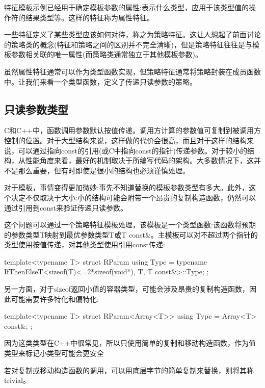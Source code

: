 
特征模板示例已经用于确定模板参数的属性:表示什么类型，应用于该类型值的操作符的结果类型等。这样的特征称为属性特征。

一些特征定义了某些类型应该如何对待，称之为策略特征。这让人想起了前面讨论的策略类的概念(特征和策略之间的区别并不完全清晰)，但是策略特征往往是与模板参数相关联的唯一属性(而策略类通常独立于其他模板参数)。

虽然属性特征通常可以作为类型函数实现，但策略特征通常将策略封装在成员函数中。让我们来看一个类型函数，定义了传递只读参数的策略。

\subsection{只读参数类型}

C和C++中，函数调用参数默认按值传递。调用方计算的参数值可复制到被调用方控制的位置。对于大型结构来说，这样做的代价会很高，而且对于这样的结构来说，可以通过指向const的引用(或C中指向const的指针)传递参数。对于较小的结构，从性能角度来看，最好的机制取决于所编写代码的架构。大多数情况下，这并不是那么重要，但有时即使是很小的结构也必须谨慎处理。

对于模板，事情变得更加微妙:事先不知道替换的模板参数类型有多大。此外，这个决定不仅取决于大小:小的结构可能会附带一个昂贵的复制构造函数，仍然可以通过引用到const来验证传递只读参数。

这个问题可以通过一个策略特征模板处理，该模板是一个类型函数:该函数将预期的参数类型T映射到最优参数类型T或T const\&。主模板可以对不超过两个指针的类型使用按值传递，对其他类型使用引用const传递:

\begin{cpp}
template<typename T>
struct RParam {
	using Type = typename IfThenElseT<sizeof(T)<=2*sizeof(void*),
									T,
									T const&>::Type;
};
\end{cpp}

另一方面，对于sizeof返回小值的容器类型，可能会涉及昂贵的复制构造函数，因此可能需要许多特化和偏特化:

\begin{cpp}
template<typename T>
struct RParam<Array<T>> {
	using Type = Array<T> const&;
};
\end{cpp}

因为这类类型在C++中很常见，所以只使用简单的复制和移动构造函数，作为值类型来标记小类型可能会更安全

\begin{notice}若对复制或移动构造函数的调用，可以用底层字节的简单复制来替换，则将其称trivial。
\end{notice}

